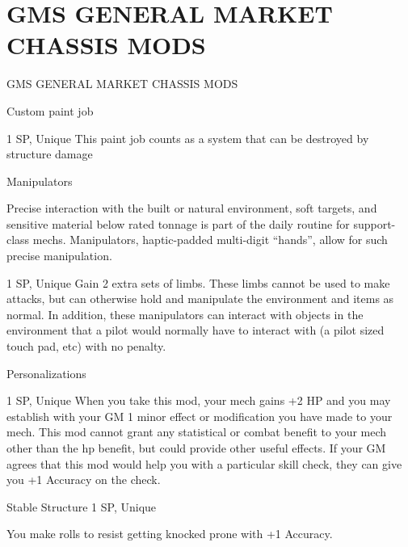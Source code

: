 \section{GMS GENERAL MARKET CHASSIS MODS}
                       GMS GENERAL MARKET CHASSIS MODS
 

Custom paint job
 
1 SP, Unique  
This paint job counts as a system that can be destroyed by structure damage
 

Manipulators  

                                                                                                             


Precise interaction with the built or natural environment, soft targets, and sensitive material below rated  
tonnage is part of the daily routine for support-class mechs. Manipulators, haptic-padded multi-digit  
“hands”, allow for such precise manipulation.   

1 SP, Unique  
Gain 2 extra sets of limbs. These limbs cannot be used to make attacks, but can otherwise hold  
and manipulate the environment and items as normal. In addition, these manipulators can  
interact with objects in the environment that a pilot would normally have to interact with (a pilot  
sized touch pad, etc) with no penalty.
 

Personalizations  

1 SP, Unique  
When you take this mod, your mech gains +2 HP and you may establish with your GM 1 minor  
effect or modification you have made to your mech. This mod cannot grant any statistical or  
combat benefit to your mech other than the hp benefit, but could provide other useful effects. If  
your GM agrees that this mod would help you with a particular skill check, they can give you +1  
Accuracy on the check.
 

Stable Structure  
1 SP, Unique  

You make rolls to resist getting knocked prone with +1 Accuracy.